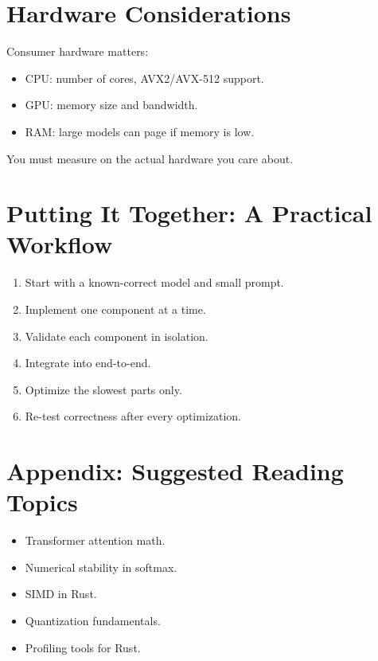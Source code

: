 \documentclass[11pt]{article}
\begin{document}
\section{Hardware Considerations}
Consumer hardware matters:
\begin{itemize}
  \item CPU: number of cores, AVX2/AVX-512 support.
  \item GPU: memory size and bandwidth.
  \item RAM: large models can page if memory is low.
\end{itemize}

You must measure on the actual hardware you care about.

\section{Putting It Together: A Practical Workflow}
\begin{enumerate}
  \item Start with a known-correct model and small prompt.
  \item Implement one component at a time.
  \item Validate each component in isolation.
  \item Integrate into end-to-end.
  \item Optimize the slowest parts only.
  \item Re-test correctness after every optimization.
\end{enumerate}

\section{Appendix: Suggested Reading Topics}
\begin{itemize}
  \item Transformer attention math.
  \item Numerical stability in softmax.
  \item SIMD in Rust.
  \item Quantization fundamentals.
  \item Profiling tools for Rust.
\end{itemize}
\end{document}
